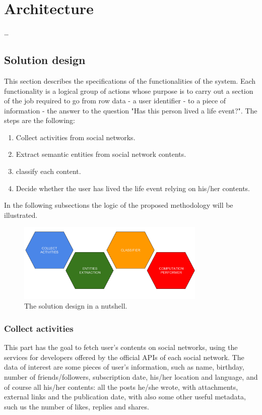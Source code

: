 \chapter{Architecture}
\label{cha:architecture}

\dots

\section{Solution design}
\label{sec:design}
This section describes the specifications of the functionalities of the system. Each functionality is a logical group of actions whose purpose is to carry out a section of the job required to go from row data - a user identifier - to a piece of information - the answer to the question "Has this person lived a life event?". The steps are the following:
\begin{enumerate}
\item Collect activities from social networks.
\item Extract semantic entities from social network contents.
\item classify each content.
\item Decide whether the user has lived the life event relying on his/her contents.
\end{enumerate}
In the following subsections the logic of the proposed methodology will be illustrated.

\begin{figure}
\centering
\includegraphics[width=%
0.8\textwidth]{img/Solutiondesign_nutshell}
\caption{The solution design in a nutshell.}
\label{fig:nutshell}
\end{figure}

\subsection{Collect activities}
This part has the goal to fetch user's contents on social networks, using the services for developers offered by the official APIs of each social network. The data of interest are some pieces of user's information, such as name, birthday, number of friends/followers, subscription date, his/her location and language, and of course all his/her contents: all the posts he/she wrote, with attachments, external links and the publication date, with also some other useful metadata, such us the number of likes, replies and shares.

